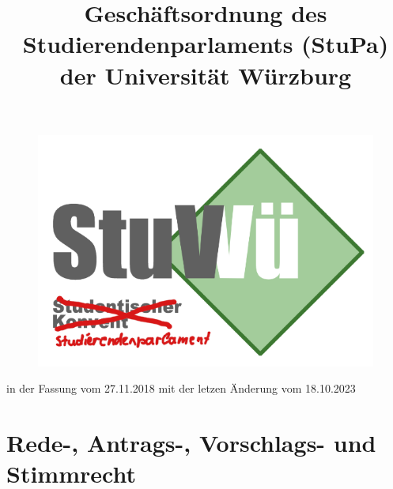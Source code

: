 \documentclass[10pt,a4paper]{scrartcl}
\title{\LARGE Geschäftsordnung des Studierendenparlaments (StuPa) der Universität Würzburg}
\date{}
\begin{document}
\maketitle

\begin{figure}[h]
	\includegraphics[width=\textwidth]{logo.png}
\end{figure}


\vspace{2cm}

{\centering \Large \sffamily in der Fassung vom 27.11.2018 mit der letzen Änderung
vom 18.10.2023}

\pagebreak

\setcounter{tocdepth}{4}
\tableofcontents

\pagebreak


\section{Rede-, Antrags-, Vorschlags- und
Stimmrecht}\label{rede--antrags--vorschlags--und-stimmrecht}
\end{document}
